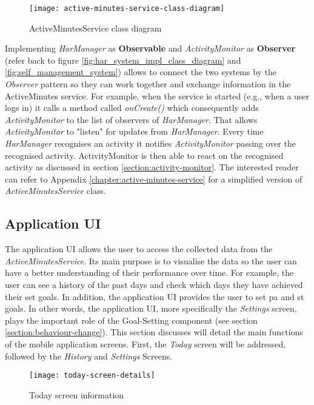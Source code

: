     \begin{figure}[ht]
    \centering
    \texttt{[image: active-minutes-service-class-diagram]}
    \caption{ActiveMinutesService class diagram}
    \label{fig:active-minutes-service-class-diagram}
    \end{figure}
    
    Implementing \textit{HarManager} as \textbf{Observable} and \textit{ActivityMonitor} as \textbf{Observer}  (refer back to figure \ref{fig:har_system_impl_class_diagram} and \ref{fig:self_management_system}) allows to connect the two systems by the \textit{Observer} pattern so they can work together and exchange information in the ActiveMinutes service. For example, when the service is started (e.g., when a user logs in) it calls a method called \textit{onCreate()} which consequently adds \textit{ActivityMonitor} to the list of observers of \textit{HarManager}. That allows \textit{ActivityMonitor} to "listen" for updates from \textit{HarManager}. Every time \textit{HarManager} recognises an activity it notifies \textit{ActivityMonitor} passing over the recognised activity. ActivityMonitor is then able to react on the recognised activity as discussed in section \ref{section:activity-monitor}. The interested reader can refer to Appendix \ref{chapter:active-minutes-service} for a simplified version of \textit{ActiveMinutesService} class.

    
    \subsection{Application UI}
    The application UI allows the user to access the collected data from the \textit{ActiveMinutesService}. Its main purpose is to visualise the data so the user can have a better understanding of their performance over time. For example, the user can see a history of the past days and check which days they have achieved their set goals. In addition, the application UI provides the user to set \gls{pa} and \gls{st} goals. In other words, the application UI, more specifically the \textit{Settings} screen, plays the important role of the Goal-Setting component (see section \ref{section:behaviour-change}). This section discusses will detail the main functions of the mobile application screens. First, the \textit{Today} screen will be addressed, followed by the \textit{History} and \textit{Settings} Screens. 
    
    \begin{wrapfigure}{r}{0.32\textwidth}
    \begin{center}
    \texttt{[image: today-screen-details]}
    \end{center}
    \caption{Today screen information}
    \label{fig:today-screen-info}
    \end{wrapfigure}
    
